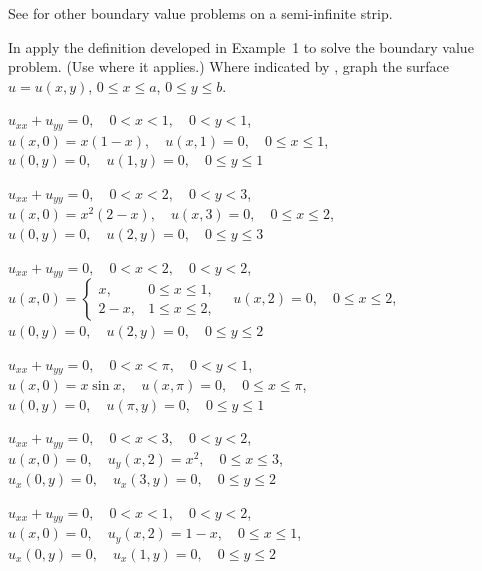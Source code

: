 See   for other boundary value
problems  on a semi-infinite strip.

\exercises
In  apply the definition
developed in Example~1 to  solve the boundary
value problem. (Use  where it
applies.)
 Where indicated by \Cex, graph the surface
$u=u(x,y)$, $0\le x\le a$, $0\le y\le b$.

\begin{exerciselist}

\item\label{exer:12.3.1}$u_{xx}+u_{yy}=0,\quad 0<x<1,\quad  0<y<1$,\\
$u(x,0)=x(1-x),\quad u(x,1)=0,\quad 0\le x\le 1$,\\
$u(0,y)=0,\quad u(1,y)=0,\quad 0\le y\le 1$

\item\label{exer:12.3.2}$u_{xx}+u_{yy}=0,\quad 0<x<2,\quad  0<y<3$,\\
$u(x,0)=x^2(2-x),\quad u(x,3)=0,\quad 0\le x\le 2$,\\
$u(0,y)=0,\quad u(2,y)=0,\quad 0\le y\le 3$

\item\label{exer:12.3.3}\Cex
$u_{xx}+u_{yy}=0,\quad 0<x<2,\quad  0<y<2$,\\
$u(x,0)=
\begin{cases}
x,& 0\le x\le 1,\\
2-x,&1\le x\le2,
\end{cases}
\quad u(x,2)=0,\quad 0\le x\le 2$,\\
$u(0,y)=0,\quad u(2,y)=0,\quad 0\le y\le 2$

\item\label{exer:12.3.4}$u_{xx}+u_{yy}=0,\quad 0<x<\pi,\quad  0<y<1$,\\
$u(x,0)=x\sin x,\quad u(x,\pi)=0,\quad 0\le x\le \pi$,\\
$u(0,y)=0,\quad u(\pi,y)=0,\quad 0\le y\le 1$

\item\label{exer:12.3.5}$u_{xx}+u_{yy}=0,\quad 0<x<3,\quad  0<y<2$,\\
$u(x,0)=0,\quad u_y(x,2)=x^2,\quad 0\le x\le 3$,\\
$u_x(0,y)=0,\quad u_x(3,y)=0,\quad 0\le y\le 2$

\item\label{exer:12.3.6}$u_{xx}+u_{yy}=0,\quad 0<x<1,\quad  0<y<2$,\\
$u(x,0)=0,\quad u_y(x,2)=1-x,\quad 0\le x\le 1$,\\
$u_x(0,y)=0,\quad u_x(1,y)=0,\quad 0\le y\le 2$



\end{exerciselist}
